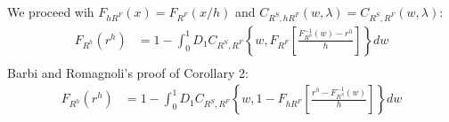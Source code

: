 \documentclass[11pt, leqno]{article}
\numberwithin{equation}{section}
\begin{document}
We proceed wih $F_{hR^F}(x)=F_{R^F}(x/h)$ and $C_{R^S,hR^F}(w, \lambda)=C_{R^S,R^F}(w, \lambda)$:
    \begin{align*}
        F_{R^h}(r^h)
        &= 1- \int^1_0 D_1 C_{R^S, R^F}
        \left\{
        w,
        F_{R^F}
        \left[
        \frac{F^{-1}_{R^S}(w)-r^h}{h}
        \right]
        \right\}dw \\
    \end{align*}
Barbi and Romagnoli's proof of Corollary 2:
    \begin{align*}
        F_{R^h}(r^h)
        &= 1 - \int^1_0 D_1 C_{R^S, R^F}
        \left\{w,
        1- F_{hR^F}\left[\frac{r^h - F^{-1}_{R^S}(w)}{h}
        \right]\right\}dw \\
    \end{align*}
\end{document}
